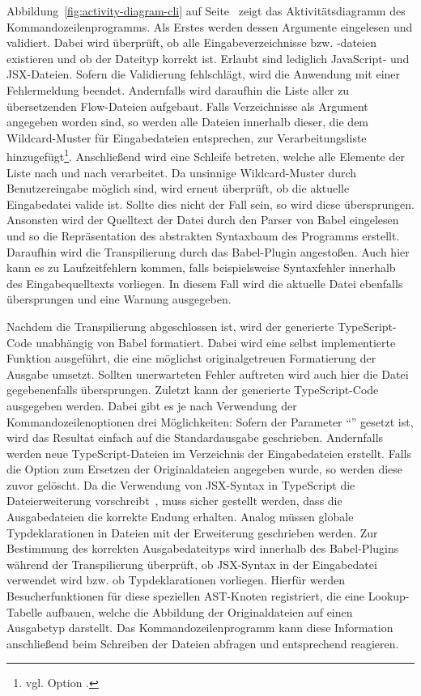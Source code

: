 {Abbildung~\ref{fig:activity-diagram-cli} auf Seite~\pageref{fig:activity-diagram-cli} zeigt das Aktivitätsdiagramm des Kommandozeilenprogramms. Als Erstes werden dessen Argumente eingelesen und validiert. Dabei wird überprüft, ob alle Eingabeverzeichnisse bzw. -dateien existieren und ob der Dateityp korrekt ist. Erlaubt sind lediglich JavaScript- und JSX-Dateien. Sofern die Validierung fehlschlägt, wird die Anwendung mit einer Fehlermeldung beendet. Andernfalls wird daraufhin die Liste aller zu übersetzenden Flow-Dateien aufgebaut. Falls Verzeichnisse als Argument angegeben worden sind, so werden alle Dateien innerhalb dieser, die dem Wildcard-Muster für Eingabedateien entsprechen, zur Verarbeitungsliste hinzugefügt\footnote{vgl. Option .}. Anschließend wird eine Schleife betreten, welche alle Elemente der Liste nach und nach verarbeitet. Da unsinnige Wildcard-Muster durch Benutzereingabe möglich sind, wird erneut überprüft, ob die aktuelle Eingabedatei valide ist. Sollte dies nicht der Fall sein, so wird diese übersprungen. Ansonsten wird der Quelltext der Datei durch den Parser von Babel eingelesen und so die Repräsentation des abstrakten Syntaxbaum des Programms erstellt. Daraufhin wird die Transpilierung durch das Babel-Plugin angestoßen. Auch hier kann es zu Laufzeitfehlern kommen, falls beispielsweise Syntaxfehler innerhalb des Eingabequelltexts vorliegen. In diesem Fall wird die aktuelle Datei ebenfalls übersprungen und eine Warnung ausgegeben.

Nachdem die Transpilierung abgeschlossen ist, wird der generierte TypeScript-Code unabhängig von Babel formatiert. Dabei wird eine selbst implementierte Funktion ausgeführt, die eine möglichst originalgetreuen Formatierung der Ausgabe umsetzt. Sollten unerwarteten Fehler auftreten wird auch hier die Datei gegebenenfalls übersprungen. Zuletzt kann der generierte TypeScript-Code ausgegeben werden. Dabei gibt es je nach Verwendung der Kommandozeilenoptionen drei Möglichkeiten: Sofern der Parameter \enquote{} gesetzt ist, wird das Resultat einfach auf die Standardausgabe geschrieben. Andernfalls werden neue TypeScript-Dateien im Verzeichnis der Eingabedateien erstellt. Falls die Option zum Ersetzen der Originaldateien angegeben wurde, so werden diese zuvor gelöscht.
Da die Verwendung von JSX-Syntax in TypeScript die Dateierweiterung  vorschreibt~\autocite{TS:HANDBOOK:JSX}, muss sicher gestellt werden, dass die Ausgabedateien die korrekte Endung erhalten. Analog müssen globale Typdeklarationen in Dateien mit der Erweiterung  geschrieben werden. Zur Bestimmung des korrekten Ausgabedateityps wird innerhalb des Babel-Plugins während der Transpilierung überprüft, ob JSX-Syntax in der Eingabedatei verwendet wird bzw. ob Typdeklarationen vorliegen. Hierfür werden Besucherfunktionen für diese speziellen AST-Knoten registriert, die eine Lookup-Tabelle aufbauen, welche die Abbildung der Originaldateien auf einen Ausgabetyp darstellt. Das Kommandozeilenprogramm kann diese Information anschließend beim Schreiben der Dateien abfragen und entsprechend reagieren.

}
